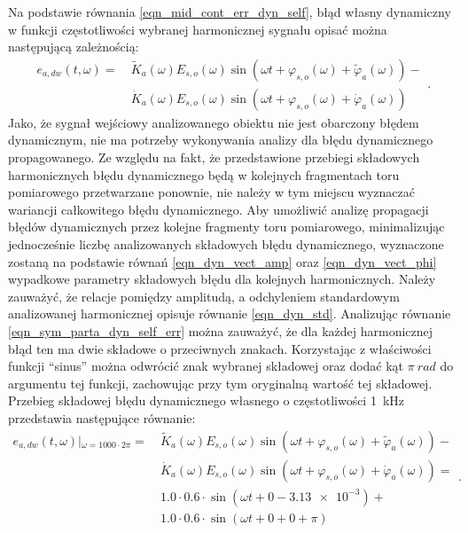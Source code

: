 Na podstawie równania \eqref{eqn_mid_cont_err_dyn_self}, błąd własny dynamiczny w funkcji częstotliwości wybranej harmonicznej sygnału opisać można następującą zależnością:
\begin{equation}
\begin{split}
e_{a,dw} \left( t,\omega \right) = ~
& \tilde{K}_{a} \left( \omega \right) E_{s,o} \left( \omega \right) \sin \left( \omega t + \varphi_{s,o} \left( \omega \right) + \tilde{\varphi}_{a} \left( \omega \right) \right) - \\
& \dot{K}_{a} \left( \omega \right) E_{s,o} \left( \omega \right) \sin \left( \omega t + \varphi_{s,o} \left( \omega \right) + \dot{\varphi}_{a} \left( \omega \right) \right)
\end{split}
\label{eqn_sym_parta_dyn_self_err}.
\end{equation}
Jako, że sygnał wejściowy analizowanego obiektu nie jest obarczony błędem dynamicznym, nie ma potrzeby wykonywania analizy dla błędu dynamicznego propagowanego. Ze względu na fakt, że przedstawione przebiegi składowych harmonicznych błędu dynamicznego będą w kolejnych fragmentach toru pomiarowego przetwarzane ponownie, nie należy w tym miejscu wyznaczać wariancji całkowitego błędu dynamicznego. Aby umożliwić analizę propagacji błędów dynamicznych przez kolejne fragmenty toru pomiarowego, minimalizując jednocześnie liczbę analizowanych składowych błędu dynamicznego, wyznaczone zostaną na podstawie równań \eqref{eqn_dyn_vect_amp} oraz \eqref{eqn_dyn_vect_phi} wypadkowe parametry składowych błędu dla kolejnych harmonicznych. Należy zauważyć, że relacje pomiędzy amplitudą, a odchyleniem standardowym analizowanej harmonicznej opisuje równanie \eqref{eqn_dyn_std}. Analizując równanie \eqref{eqn_sym_parta_dyn_self_err} można zauważyć, że dla każdej harmonicznej błąd ten ma dwie składowe o przeciwnych znakach. Korzystając z właściwości funkcji \enquote{sinus} można odwrócić znak wybranej składowej oraz dodać kąt $\pi~\unit{rad}$ do argumentu tej funkcji, zachowując przy tym oryginalną wartość tej składowej. Przebieg składowej błędu dynamicznego własnego o częstotliwości \qty{1}{kHz} przedstawia następujące równanie:
\begin{equation}
\begin{split}
e_{a,dw} \left( t,\omega \right) \left|_{\omega = 1000 \cdot 2 \pi } \right. = ~
& \tilde{K}_{a} \left( \omega \right) E_{s,o} \left( \omega \right) \sin \left( \omega t + \varphi_{s,o} \left( \omega \right) + \tilde{\varphi}_{a} \left( \omega \right) \right) - \\
& \dot{K}_{a} \left( \omega \right) E_{s,o} \left( \omega \right) \sin \left( \omega t + \varphi_{s,o} \left( \omega \right) + \dot{\varphi}_{a} \left( \omega \right) \right) = \\
& 1.0 \cdot 0.6 \cdot \sin \left( \omega t + 0 - \num{3.13e-3} \right) + \\
& 1.0 \cdot 0.6 \cdot \sin \left( \omega t + 0 + 0 + \pi \right)
\end{split}
\label{eqn_sym_parta_dyn_self_example_harm}.
\end{equation}
